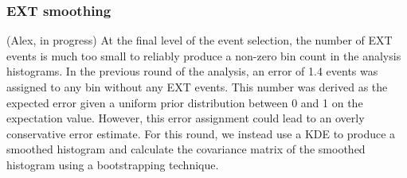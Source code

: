\subsubsection{EXT smoothing} (Alex, in progress)
\label{sec:ext_smoothing}
At the final level of the event selection, the number of EXT events is much too small to reliably produce a non-zero bin count in the analysis histograms. In the previous round of the analysis, an error of 1.4 events was assigned to any bin without any EXT events. This number was derived as the expected error given a uniform prior distribution between 0 and 1 on the expectation value. However, this error assignment could lead to an overly conservative error estimate. For this round, we instead use a KDE to produce a smoothed histogram and calculate the covariance matrix of the smoothed histogram using a bootstrapping technique.

